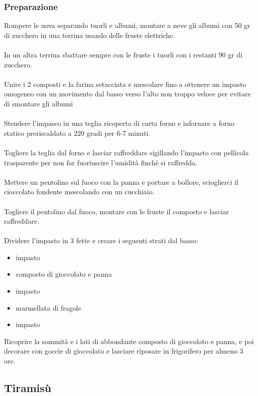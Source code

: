\documentclass[12pt, a4paper]{article}
\begin{document}
\subsubsection{Preparazione}
	Rompere le uova separando tuorli e albumi, montare a neve gli albumi
	con 50 gr di zucchero in una terrina usando delle fruste elettriche.\\\\
	In un altra terrina sbattare sempre con le fruste i tuorli con i restanti
	90 gr di zucchero.\\\\
	Unire i 2 composti e la farina setacciata e mescolare fino a ottenere un impasto
	omogeneo con un movimento dal basso verso l'alto non troppo veloce per evitare di
	smontare gli albumi\\\\
	Stendere l'impasco in una teglia ricoperta di carta forno e infornare a forno statico
	preriscaldato a 220 gradi per 6-7 minuti.\\\\
	Togliere la teglia dal forno e lasciar raffreddare sigillando l'impasto con pellicola
	trasparente per non far fuoriuscire l'umidità finchè si raffredda.\\\\
	Mettere un pentolino sul fuoco con la panna e portare a bollore, scioglierci il cioccolato
	fondente mescolando con un cucchiaio.\\\\
	Togliere il pentolino dal fuoco, montare con le fruste il composto e lasciar raffreddare.\\\\
	Dividere l'impasto in 3 fette e creare i seguenti strati dal basso:
	\begin{itemize}
	\item	impasto
	\item   composto di gioccolato e panna
	\item   impasto
	\item   marmellata di fragole
	\item   impasto
	\end{itemize}
	Ricoprire la sommità e i lati di abbondante composto di gioccolato e panna, e poi decorare con
	goccie di gioccolato e lasciare riposare in frigorifero per almeno 3 ore.
\clearpage

\subsection{Tiramisù}
\end{document}
